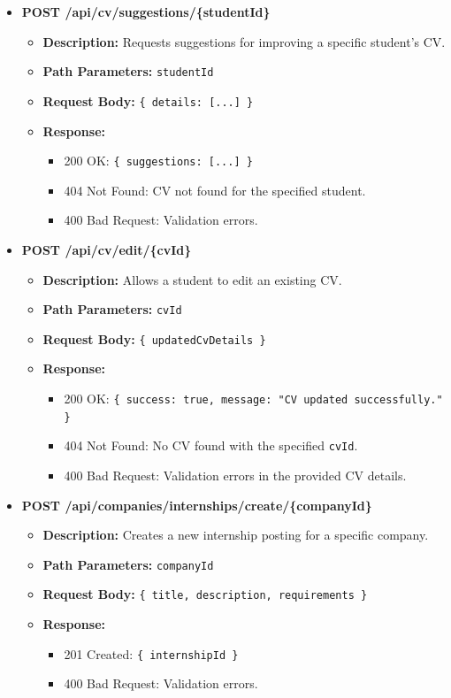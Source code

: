 \begin{itemize}
    \item \textbf{POST /api/cv/suggestions/\{studentId\}}  
    \begin{itemize}
        \item \textbf{Description:} Requests suggestions for improving a specific student's CV.
        \item \textbf{Path Parameters:} \texttt{studentId}
        \item \textbf{Request Body:} \texttt{\{ details: [...] \}}
        \item \textbf{Response:}
        \begin{itemize}
            \item 200 OK: \texttt{\{ suggestions: [...] \}}
            \item 404 Not Found: CV not found for the specified student.
            \item 400 Bad Request: Validation errors.
        \end{itemize}
    \end{itemize}

    \item \textbf{POST /api/cv/edit/\{cvId\}}  
    \begin{itemize}
        \item \textbf{Description:} Allows a student to edit an existing CV.
        \item \textbf{Path Parameters:} \texttt{cvId}
        \item \textbf{Request Body:} \texttt{\{ updatedCvDetails \}}
        \item \textbf{Response:}
        \begin{itemize}
            \item 200 OK: \texttt{\{ success: true, message: "CV updated successfully." \}}
            \item 404 Not Found: No CV found with the specified \texttt{cvId}.
            \item 400 Bad Request: Validation errors in the provided CV details.
        \end{itemize}
    \end{itemize}


    \item \textbf{POST /api/companies/internships/create/\{companyId\}}  
    \begin{itemize}
        \item \textbf{Description:} Creates a new internship posting for a specific company.
        \item \textbf{Path Parameters:} \texttt{companyId}
        \item \textbf{Request Body:} \texttt{\{ title, description, requirements \}}
        \item \textbf{Response:}
        \begin{itemize}
            \item 201 Created: \texttt{\{ internshipId \}}
            \item 400 Bad Request: Validation errors.
        \end{itemize}
    \end{itemize}
    

\end{itemize}
